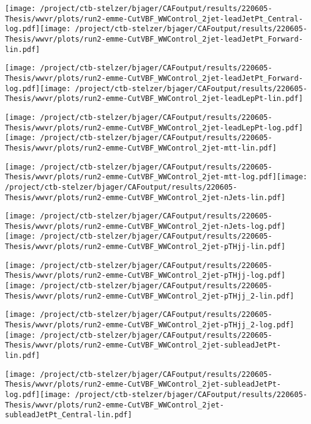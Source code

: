 \documentclass{article}
\begin{document}
\texttt{[image: /project/ctb-stelzer/bjager/CAFoutput/results/220605-Thesis/wwvr/plots/run2-emme-CutVBF\_WWControl\_2jet-leadJetPt\_Central-log.pdf]}\texttt{[image: /project/ctb-stelzer/bjager/CAFoutput/results/220605-Thesis/wwvr/plots/run2-emme-CutVBF\_WWControl\_2jet-leadJetPt\_Forward-lin.pdf]}

\texttt{[image: /project/ctb-stelzer/bjager/CAFoutput/results/220605-Thesis/wwvr/plots/run2-emme-CutVBF\_WWControl\_2jet-leadJetPt\_Forward-log.pdf]}\texttt{[image: /project/ctb-stelzer/bjager/CAFoutput/results/220605-Thesis/wwvr/plots/run2-emme-CutVBF\_WWControl\_2jet-leadLepPt-lin.pdf]}

\texttt{[image: /project/ctb-stelzer/bjager/CAFoutput/results/220605-Thesis/wwvr/plots/run2-emme-CutVBF\_WWControl\_2jet-leadLepPt-log.pdf]}\texttt{[image: /project/ctb-stelzer/bjager/CAFoutput/results/220605-Thesis/wwvr/plots/run2-emme-CutVBF\_WWControl\_2jet-mtt-lin.pdf]}

\texttt{[image: /project/ctb-stelzer/bjager/CAFoutput/results/220605-Thesis/wwvr/plots/run2-emme-CutVBF\_WWControl\_2jet-mtt-log.pdf]}\texttt{[image: /project/ctb-stelzer/bjager/CAFoutput/results/220605-Thesis/wwvr/plots/run2-emme-CutVBF\_WWControl\_2jet-nJets-lin.pdf]}

\texttt{[image: /project/ctb-stelzer/bjager/CAFoutput/results/220605-Thesis/wwvr/plots/run2-emme-CutVBF\_WWControl\_2jet-nJets-log.pdf]}\texttt{[image: /project/ctb-stelzer/bjager/CAFoutput/results/220605-Thesis/wwvr/plots/run2-emme-CutVBF\_WWControl\_2jet-pTHjj-lin.pdf]}

\texttt{[image: /project/ctb-stelzer/bjager/CAFoutput/results/220605-Thesis/wwvr/plots/run2-emme-CutVBF\_WWControl\_2jet-pTHjj-log.pdf]}\texttt{[image: /project/ctb-stelzer/bjager/CAFoutput/results/220605-Thesis/wwvr/plots/run2-emme-CutVBF\_WWControl\_2jet-pTHjj\_2-lin.pdf]}

\texttt{[image: /project/ctb-stelzer/bjager/CAFoutput/results/220605-Thesis/wwvr/plots/run2-emme-CutVBF\_WWControl\_2jet-pTHjj\_2-log.pdf]}\texttt{[image: /project/ctb-stelzer/bjager/CAFoutput/results/220605-Thesis/wwvr/plots/run2-emme-CutVBF\_WWControl\_2jet-subleadJetPt-lin.pdf]}

\texttt{[image: /project/ctb-stelzer/bjager/CAFoutput/results/220605-Thesis/wwvr/plots/run2-emme-CutVBF\_WWControl\_2jet-subleadJetPt-log.pdf]}\texttt{[image: /project/ctb-stelzer/bjager/CAFoutput/results/220605-Thesis/wwvr/plots/run2-emme-CutVBF\_WWControl\_2jet-subleadJetPt\_Central-lin.pdf]}
\end{document}
